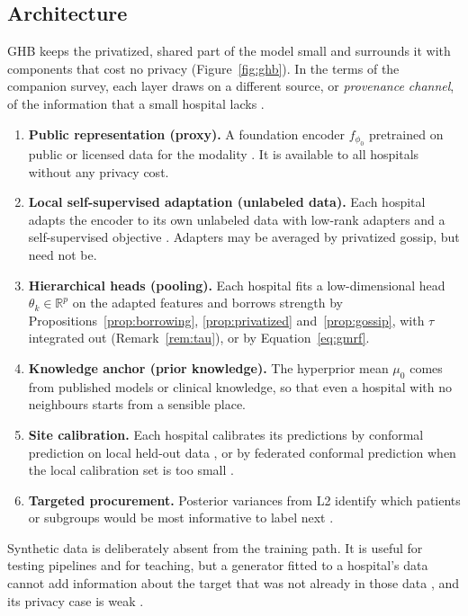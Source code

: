 \documentclass[acmsmall,screen,review]{acmart}
\theoremstyle{acmdefinition}
\begin{document}
\subsection{Architecture}\label{sec:architecture}

GHB keeps the privatized, shared part of the model small and surrounds it with components that cost no privacy (Figure~\ref{fig:ghb}). In the terms of the companion survey, each layer draws on a different source, or \emph{provenance channel}, of the information that a small hospital lacks \cite{simoes2026collectively}.
\begin{enumerate}[label=\textbf{L\arabic*},start=0,leftmargin=*]
\item \textbf{Public representation (proxy).} A foundation encoder $f_{\phi_0}$ pretrained on public or licensed data for the modality \cite{moor2023foundation,rasmy2021med,zhou2023foundation}. It is available to all hospitals without any privacy cost.
\item \textbf{Local self-supervised adaptation (unlabeled data).} Each hospital adapts the encoder to its own unlabeled data with low-rank adapters \cite{hu2022lora} and a self-supervised objective \cite{chen2020simple,he2022masked}. Adapters may be averaged by privatized gossip, but need not be.
\item \textbf{Hierarchical heads (pooling).} Each hospital fits a low-dimensional head $\theta_k\in\mathbb{R}^p$ on the adapted features and borrows strength by Propositions~\ref{prop:borrowing}, \ref{prop:privatized} and~\ref{prop:gossip}, with $\tau$ integrated out (Remark~\ref{rem:tau}), or by Equation~\eqref{eq:gmrf}.
\item \textbf{Knowledge anchor (prior knowledge).} The hyperprior mean $\mu_0$ comes from published models or clinical knowledge, so that even a hospital with no neighbours starts from a sensible place.
\item \textbf{Site calibration.} Each hospital calibrates its predictions by conformal prediction on local held-out data \cite{angelopoulos2023conformal,shafer2008tutorial}, or by federated conformal prediction when the local calibration set is too small \cite{lu2023federated}.
\item \textbf{Targeted procurement.} Posterior variances from L2 identify which patients or subgroups would be most informative to label next \cite{settles2009active}.
\end{enumerate}

Synthetic data is deliberately absent from the training path. It is useful for testing pipelines and for teaching, but a generator fitted to a hospital's data cannot add information about the target that was not already in those data \cite{simoes2026collectively}, and its privacy case is weak \cite{stadler2022synthetic}.
\end{document}
